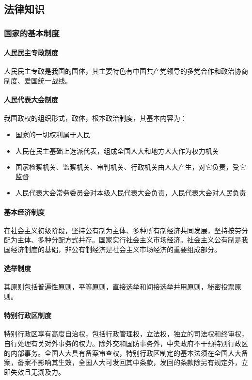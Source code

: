 \subsection{法律知识}

\subsubsection{国家的基本制度}

\paragraph{人民民主专政制度} 人民民主专政是我国的国体，其主要特色有中国共产党领导的多党合作和政治协商制度、爱国统一战线。

\paragraph{人民代表大会制度} 我国政权的组织形式，政体，根本政治制度，其基本内容为：

\begin{itemize}
	\item 国家的一切权利属于人民
	\item 人民在民主基础上选派代表，组成全国人大和地方人大作为权力机关
	\item 国家检察机关、监察机关、审判机关、行政机关由人大产生，对它负责，受它监督
	\item 人民代表大会常务委员会对本级人民代表大会负责，人民代表大会对人民负责
\end{itemize}

\paragraph{基本经济制度} 在社会主义初级阶段，坚持公有制为主体、多种所有制经济共同发展，坚持按劳分配为主体、多种分配方式并存。国家实行社会主义市场经济。社会主义公有制是我国经济制度的基础，非公有制经济是社会主义市场经济的重要组成部分。

\paragraph{选举制度} 其原则包括普遍性原则，平等原则，直接选举和间接选举并用原则，秘密投票原则。

\paragraph{特别行政区制度} 特别行政区享有高度自治权，包括行政管理权，立法权，独立的司法权和终审权，自行处理有关对外事务的权力。除外交和国防事务外，中央政府不干预特别行政区的内部事务。全国人大具有备案审查权，特别行政区制定的基本法须在全国人大备案，备案不影响其生效，全国人大可发回其中条款，发回的条款除另有规定外，立即失效且无溯及力。


